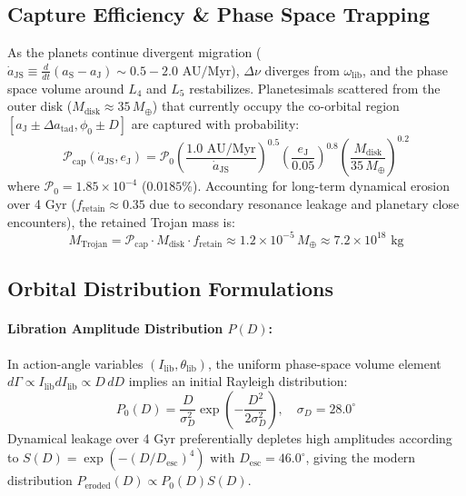 \documentclass[11pt,a4paper]{article}
\begin{document}
\subsection{Capture Efficiency \& Phase Space Trapping}
As the planets continue divergent migration ($\dot{a}_{\text{JS}} \equiv \frac{d}{dt}(a_{\text{S}} - a_{\text{J}}) \sim 0.5-2.0\text{ AU/Myr}$), $\Delta \nu$ diverges from $\omega_{\text{lib}}$, and the phase space volume around $L_4$ and $L_5$ restabilizes. Planetesimals scattered from the outer disk ($M_{\text{disk}} \approx 35\,M_\oplus$) that currently occupy the co-orbital region $[a_{\text{J}} \pm \Delta a_{\text{tad}}, \phi_0 \pm D]$ are captured with probability:
\begin{equation}
\mathcal{P}_{\text{cap}}(\dot{a}_{\text{JS}}, e_{\text{J}}) = \mathcal{P}_0 \left(\frac{1.0\text{ AU/Myr}}{\dot{a}_{\text{JS}}}\right)^{0.5} \left(\frac{e_{\text{J}}}{0.05}\right)^{0.8} \left(\frac{M_{\text{disk}}}{35\,M_\oplus}\right)^{0.2}
\end{equation}
where $\mathcal{P}_0 = 1.85 \times 10^{-4}$ ($0.0185\%$). Accounting for long-term dynamical erosion over 4 Gyr ($f_{\text{retain}} \approx 0.35$ due to secondary resonance leakage and planetary close encounters), the retained Trojan mass is:
\begin{equation}
M_{\text{Trojan}} = \mathcal{P}_{\text{cap}} \cdot M_{\text{disk}} \cdot f_{\text{retain}} \approx 1.2 \times 10^{-5}\,M_\oplus \approx 7.2 \times 10^{18}\text{ kg}
\end{equation}

\subsection{Orbital Distribution Formulations}
\paragraph{Libration Amplitude Distribution $P(D)$:} In action-angle variables $(I_{\text{lib}}, \theta_{\text{lib}})$, the uniform phase-space volume element $d\Gamma \propto I_{\text{lib}} dI_{\text{lib}} \propto D\,dD$ implies an initial Rayleigh distribution:
\begin{equation}
P_0(D) = \frac{D}{\sigma_D^2} \exp\left(-\frac{D^2}{2\sigma_D^2}\right), \quad \sigma_D = 28.0^\circ
\end{equation}
Dynamical leakage over 4 Gyr preferentially depletes high amplitudes according to $S(D) = \exp\left(-(D / D_{\text{esc}})^4\right)$ with $D_{\text{esc}} = 46.0^\circ$, giving the modern distribution $P_{\text{eroded}}(D) \propto P_0(D) S(D)$.
\end{document}
